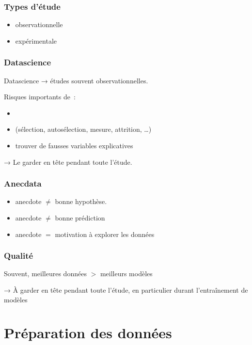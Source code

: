 \documentclass{formation}
\begin{document}
\begin{frame}
  \frametitle{Types d'étude}
  \begin{itemize}
  \item observationnelle
  \item expérimentale
  \end{itemize}

\end{frame}

\begin{frame}
  \frametitle{Datascience}

  Datascience → études souvent observationnelles.

  Risques importants de :

  \begin{itemize}[<+->]
  \item {}
  \item {} (sélection,
    autosélection, mesure, attrition, …)
  \item trouver de fausses variables explicatives
  \end{itemize}

  \pause

  → Le garder en tête pendant toute l'étude.
\end{frame}

\begin{frame}
  \frametitle{Anecdata}

  \begin{itemize}[<+->]
  \item anecdote $\neq$ bonne hypothèse. 
  \item anecdote $\neq$ bonne prédiction
  \item anecdote $=$ motivation à explorer les données
  \end{itemize}
\end{frame}

\begin{frame}
  \frametitle{Qualité}

  Souvent, meilleures données $>$ meilleurs modèles

  → À garder en tête pendant toute l'étude, en particulier durant
  l'entraînement de modèles
\end{frame}

\section{Préparation des données}
\end{document}

